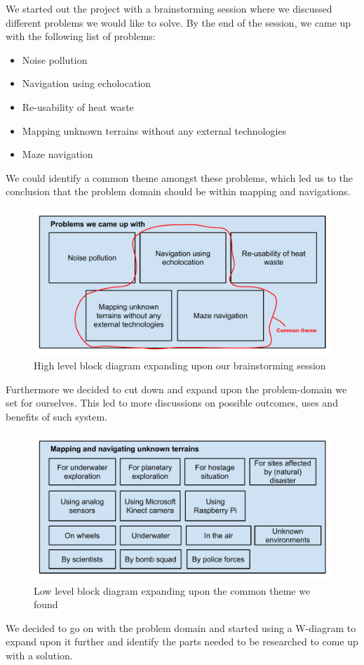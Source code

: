We started out the project with a brainstorming session where we discussed different problems we would like to solve. By the end of the session, we came up with the following list of problems:
\begin{itemize}
	\item Noise pollution
	\item Navigation using echolocation
	\item Re-usability of heat waste
	\item Mapping unknown terrains without any external technologies
	\item Maze navigation
\end{itemize}

We could identify a common theme amongst these problems, which led us to the conclusion that the problem domain should be within mapping and navigations. 

\begin{figure}[!h]
	\centering
	\includegraphics[scale=.7]{images/high-level-block.pdf}
	\caption{High level block diagram expanding upon our brainstorming session}
	\label{fig:highlevelblock}
\end{figure}

Furthermore we decided to cut down and expand upon the problem-domain we set for ourselves.
This led to more discussions on possible outcomes, uses and benefits of such system.

\begin{figure}[!h]
	\centering
	\includegraphics[scale=.7]{images/low-level-block.pdf}
	\caption{Low level block diagram expanding upon the common theme we found}
	\label{fig:lowlevelblock}
\end{figure}

We decided to go on with the problem domain and started using a W-diagram to expand upon it further and identify the parts needed to be researched to come up with a solution.